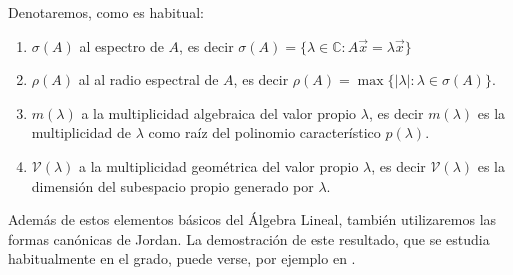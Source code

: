 \documentclass[size=a4, parskip=half, titlepage=false, toc=flat, toc=bib, 12pt]{scrartcl}
\theoremstyle{theorem-style}
\theoremstyle{definition-style}
\theoremstyle{remark-style}
\theoremstyle{example-style}
\theoremstyle{definition-style}
\theoremstyle{remark-style}
\begin{document}
Denotaremos, como es habitual:
\begin{enumerate}
\item $\sigma (A)$ al espectro de $A$, es decir $\sigma(A) = \{ \lambda \in \mathbb{C} : A\vec{x} = \lambda \vec{x}\}$
\item $\rho(A)$ al al radio espectral de $A$, es decir $\rho(A) = \max\{|\lambda| : \lambda \in \sigma(A) \}$.
\item $m(\lambda)$ a la multiplicidad algebraica del valor propio $\lambda$, es decir $m(\lambda)$ es la multiplicidad de $\lambda$ como raíz del polinomio característico $p(\lambda)$.
\item $\mathcal{V}(\lambda)$ a la multiplicidad geométrica del valor propio $\lambda$, es decir $\mathcal{V}(\lambda)$ es la dimensión del subespacio propio generado por $\lambda$.
\end{enumerate}

Además de estos elementos básicos del Álgebra Lineal, también utilizaremos las formas canónicas de Jordan. La demostración de este resultado, que se estudia habitualmente en el grado, puede verse, por ejemplo en \cite{jordan}.
\end{document}
